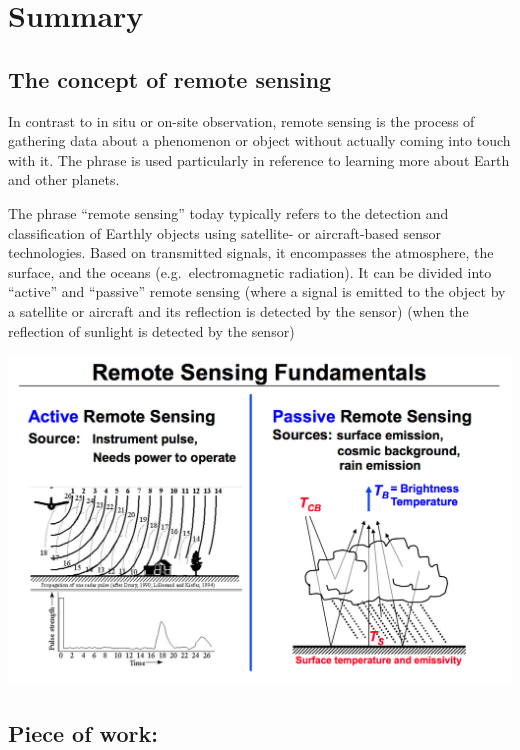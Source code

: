 \documentclass[
  letterpaper,
  DIV=11,
  numbers=noendperiod]{scrreprt}
\begin{document}
\hypertarget{summary}{%
\section{Summary}\label{summary}}

\hypertarget{the-concept-of-remote-sensing}{%
\subsection{The concept of remote
sensing}\label{the-concept-of-remote-sensing}}

In contrast to in situ or on-site observation, remote sensing is the
process of gathering data about a phenomenon or object without actually
coming into touch with it. The phrase is used particularly in reference
to learning more about Earth and other planets.

The phrase ``remote sensing'' today typically refers to the detection
and classification of Earthly objects using satellite- or aircraft-based
sensor technologies. Based on transmitted signals, it encompasses the
atmosphere, the surface, and the oceans (e.g.~electromagnetic
radiation). It can be divided into ``active'' and ``passive'' remote
sensing (where a signal is emitted to the object by a satellite or
aircraft and its reflection is detected by the sensor) (when the
reflection of sunlight is detected by the sensor)

\includegraphics{./image/diagram.jpg}

\hypertarget{piece-of-work}{%
\subsection{Piece of work:}\label{piece-of-work}}
\end{document}

